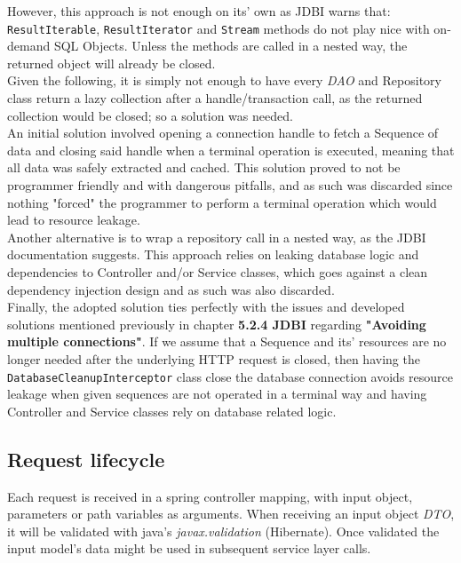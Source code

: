 However, this approach is not enough on its' own as JDBI warns that:\\

\texttt{ResultIterable}, \texttt{ResultIterator} and \texttt{Stream} methods do not play nice with on-demand SQL Objects. Unless the methods are called in a nested way, the
returned object will already be closed.\\

Given the following, it is simply not enough to have every \textit{DAO} and Repository class return a lazy collection after a handle/transaction call,
as the returned collection would be closed; so a solution was needed.\\

An initial solution involved opening a connection handle to fetch a Sequence of data and closing said handle when a terminal operation is executed, meaning that all data was
safely extracted and cached. This solution proved to not be programmer friendly and with dangerous pitfalls, and as such was discarded since nothing "forced" the programmer to
perform a terminal operation which would lead to resource leakage.\\ 

Another alternative is to wrap a repository call in a nested way, as the JDBI documentation suggests. This approach relies on leaking database logic and dependencies to Controller
and/or Service classes, which goes against a clean dependency injection design and as such was also discarded.\\

Finally, the adopted solution ties perfectly with the issues and developed solutions mentioned previously in chapter \textbf{5.2.4 JDBI} regarding \textbf{"Avoiding multiple connections"}.
If we assume that a Sequence and its' resources are no longer needed after the underlying HTTP request is closed, then having the \texttt{DatabaseCleanupInterceptor} class close the
database connection avoids resource leakage when given sequences are not operated in a terminal way and having Controller and Service classes rely on database  related logic.


\subsection{Request lifecycle}
Each request is received in a spring controller mapping, with input object,
parameters or path variables as arguments. When receiving an input object \textit{DTO},
it will be validated with java's \textit{javax.validation} (Hibernate).
Once validated the input model's data might be used in subsequent service layer calls.\\

